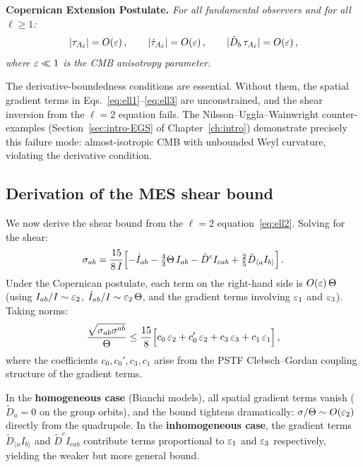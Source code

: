 \medskip
\noindent\textbf{Copernican Extension Postulate.}\quad
\textit{For all fundamental observers and for all $\ell \geq 1$:
\begin{equation}\label{eq:copernican}
|\tau_{A_\ell}| = O(\varepsilon)\,,\qquad
|\dot{\tau}_{A_\ell}| = O(\varepsilon)\,,\qquad
|\tilde{D}_b\,\tau_{A_\ell}| = O(\varepsilon)\,,
\end{equation}
where $\varepsilon \ll 1$ is the CMB anisotropy parameter.}
\medskip

The derivative-boundedness conditions are essential.  Without
them, the spatial gradient terms in
Eqs.~\eqref{eq:ell1}--\eqref{eq:ell3} are unconstrained, and
the shear inversion from the $\ell = 2$ equation fails.  The
Nilsson--Uggla--Wainwright counter-examples
(Section~\ref{sec:intro-EGS} of Chapter~\ref{ch:intro})
demonstrate precisely this failure mode: almost-isotropic CMB
with unbounded Weyl curvature, violating the derivative
condition.


\subsection{Derivation of the MES shear bound}
\label{sec:MES-shear-derivation}

We now derive the shear bound from the $\ell = 2$
equation~\eqref{eq:ell2}.  Solving for the shear:
\begin{equation}\label{eq:sigma-from-ell2}
\sigma_{ab}
= \frac{15}{8\,I}\Bigl[
  -\dot{I}_{ab} - \tfrac{4}{3}\Theta\,I_{ab}
  - \tilde{D}^c I_{cab}
  + \tfrac{2}{5}\tilde{D}_{\langle a} I_{b\rangle}
\Bigr]\,.
\end{equation}
Under the Copernican postulate, each term on the right-hand
side is $O(\varepsilon)\,\Theta$ (using $I_{ab}/I \sim \varepsilon_2$,
$\dot{I}_{ab}/I \sim \varepsilon_2\,\Theta$, and the gradient
terms involving $\varepsilon_1$ and $\varepsilon_3$).  Taking norms:
\begin{equation}\label{eq:sigma-bound-raw}
\frac{\sqrt{\sigma_{ab}\sigma^{ab}}}{\Theta}
\leq \frac{15}{8}\Bigl[
  c_0\,\varepsilon_2 + c_0'\,\varepsilon_2
  + c_3\,\varepsilon_3 + c_1\,\varepsilon_1
\Bigr]\,,
\end{equation}
where the coefficients $c_0, c_0', c_3, c_1$ arise from the
PSTF Clebsch--Gordan coupling structure of the gradient terms.

In the \textbf{homogeneous case} (Bianchi models), all spatial
gradient terms vanish ($\tilde{D}_a = 0$ on the group orbits),
and the bound tightens dramatically: $\sigma/\Theta \sim
O(\varepsilon_2)$ directly from the quadrupole.  In the
\textbf{inhomogeneous case}, the gradient terms
$\tilde{D}_{\langle a}I_{b\rangle}$ and
$\tilde{D}^c I_{cab}$ contribute terms proportional to
$\varepsilon_1$ and $\varepsilon_3$ respectively, yielding the weaker but
more general bound.

